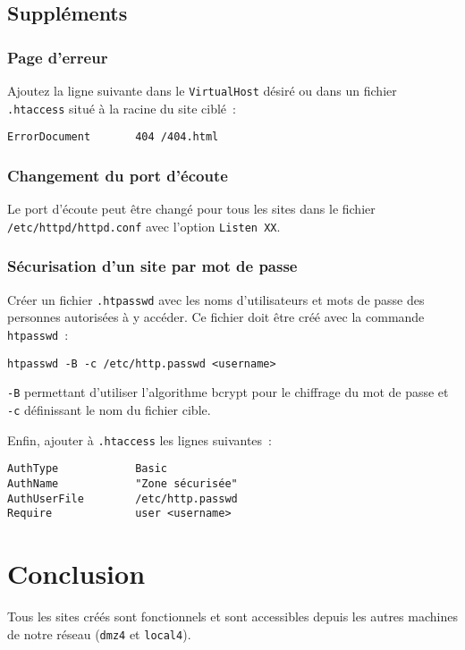 \documentclass[11pt,a4paper,oneside]{article}
\newcommand{\inlinecode}{\lstinline[breaklines=true]}
\begin{document}
\subsection{Suppléments}
\subsubsection{Page d'erreur}
Ajoutez la ligne suivante dans le \inlinecode{VirtualHost} désiré ou dans un fichier
\inlinecode{.htaccess} situé à la racine du site ciblé~:
\begin{lstlisting}
ErrorDocument       404 /404.html
\end{lstlisting}

\subsubsection{Changement du port d'écoute}
Le port d'écoute peut être changé pour tous les sites dans le fichier
\inlinecode{/etc/httpd/httpd.conf} avec l'option \inlinecode{Listen XX}.

\subsubsection{Sécurisation d'un site par mot de passe}
Créer un fichier \inlinecode{.htpasswd} avec les noms d'utilisateurs et mots de passe
des personnes autorisées à y accéder. Ce fichier doit être créé avec la commande
\inlinecode{htpasswd}~:
\begin{lstlisting}
htpasswd -B -c /etc/http.passwd <username>
\end{lstlisting}
\inlinecode{-B} permettant d'utiliser l'algorithme bcrypt pour le chiffrage du mot de
passe et \inlinecode{-c} définissant le nom du fichier cible.

Enfin, ajouter à \inlinecode{.htaccess} les lignes suivantes~:
\begin{lstlisting}
AuthType            Basic
AuthName            "Zone sécurisée"
AuthUserFile        /etc/http.passwd
Require             user <username>
\end{lstlisting}

\section{Conclusion}

Tous les sites créés sont fonctionnels et sont accessibles depuis les autres
machines de notre réseau (\inlinecode{dmz4} et \inlinecode{local4}).
\end{document}
